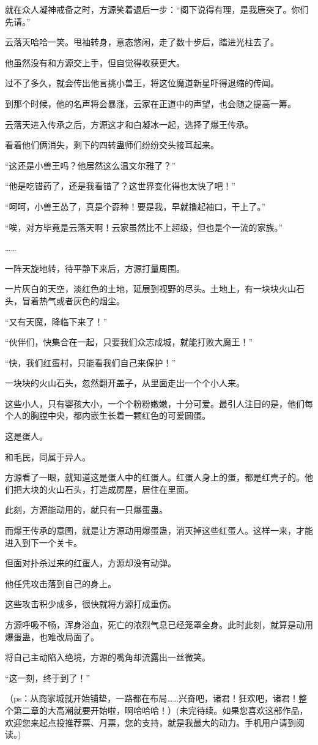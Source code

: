 \begin{this_body}
就在众人凝神戒备之时，方源笑着退后一步：“阁下说得有理，是我唐突了。你们先请。”

云落天哈哈一笑。甩袖转身，意态悠闲，走了数十步后，踏进光柱去了。

他虽然没有和方源交上手，但自觉得收获更大。

过不了多久，就会传出他言挑小兽王，将这位魔道新星吓得退缩的传闻。

到那个时候，他的名声将会暴涨，云家在正道中的声望，也会随之提高一筹。

云落天进入传承之后，方源这才和白凝冰一起，选择了爆王传承。

看着他们俩消失，剩下的四转蛊师们纷纷交头接耳起来。

“这还是小兽王吗？他居然这么温文尔雅了？”

“他是吃错药了，还是我看错了？这世界变化得也太快了吧！”

“呵呵，小兽王怂了，真是个孬种！要是我，早就撸起袖口，干上了。”

“唉，对方毕竟是云落天啊！云家虽然比不上超级，但也是个一流的家族。”

……

一阵天旋地转，待平静下来后，方源打量周围。

一片灰白的天空，淡红色的土地，延展到视野的尽头。土地上，有一块块火山石头，冒着热气或者灰色的烟尘。

“又有天魔，降临下来了！”

“伙伴们，快集合在一起，只要我们众志成城，就能打败大魔王！”

“快，我们红蛋村，只能看我们自己来保护！”

一块块的火山石头，忽然翻开盖子，从里面走出一个个小人来。

这些小人，只有婴孩大小，一个个粉粉嫩嫩，十分可爱。最引人注目的是，他们每个人的胸膛中央，都内嵌生长着一颗红色的可爱圆蛋。

这是蛋人。

和毛民，同属于异人。

方源看了一眼，就知道这是蛋人中的红蛋人。红蛋人身上的蛋，都是红壳子的。他们把大块的火山石头，打造成房屋，居住在里面。

此刻，方源能动用的，就只有一只爆蛋蛊。

而爆王传承的意图，就是让方源动用爆蛋蛊，消灭掉这些红蛋人。这样一来，才能进入到下一个关卡。

但面对扑杀过来的红蛋人，方源却没有动弹。

他任凭攻击落到自己的身上。

这些攻击积少成多，很快就将方源打成重伤。

方源呼吸不畅，浑身浴血，死亡的浓烈气息已经笼罩全身。此时此刻，就算是动用爆蛋蛊，也难改局面了。

将自己主动陷入绝境，方源的嘴角却流露出一丝微笑。

“这一刻，终于到了！”

（ps：从商家城就开始铺垫，一路都在布局……兴奋吧，诸君！狂欢吧，诸君！整个第二章的大高潮就要开始啦，啊哈哈哈！）(未完待续。如果您喜欢这部作品，欢迎您来起点投推荐票、月票，您的支持，就是我最大的动力。手机用户请到阅读。)

\end{this_body}

